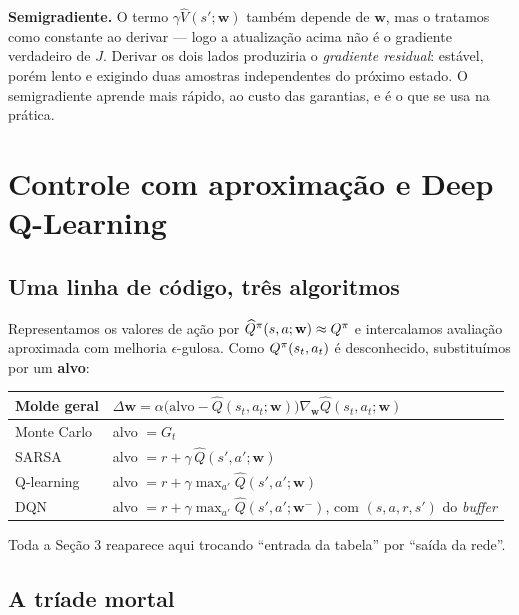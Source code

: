\documentclass[11pt]{article}
\newcommand{\Qhat}{\widehat{Q}}
\newcommand{\Vhat}{\widehat{V}}
\newcommand{\wv}{\mathbf{w}}
\newcommand{\wtar}{\mathbf{w}^{-}}
\begin{document}
\begin{ideiabox}
  \textbf{Semigradiente.} O termo $\gamma\Vhat(s';\wv)$ também depende de $\wv$,
  mas o tratamos como constante ao derivar --- logo a atualização acima não é o
  gradiente verdadeiro de $J$. Derivar os dois lados produziria o
  \emph{gradiente residual}: estável, porém lento e exigindo duas amostras
  independentes do próximo estado. O semigradiente aprende mais rápido, ao custo
  das garantias, e é o que se usa na prática.
\end{ideiabox}

\section{Controle com aproximação e Deep Q-Learning}

\subsection{Uma linha de código, três algoritmos}

Representamos os valores de ação por $\Qhat^{\pol}(s,a;\wv) \approx Q^{\pol}$ e
intercalamos avaliação aproximada com melhoria $\epsilon$-gulosa. Como
$Q^{\pi}(s_t,a_t)$ é desconhecido, substituímos por um \textbf{alvo}:

\begin{center}\small
\begin{tabular}{ll}
  \toprule
  \textbf{Molde geral} & $\Delta\wv = \alpha\bigl(\text{alvo} - \Qhat(s_t,a_t;\wv)\bigr)\nabla_{\wv}\Qhat(s_t,a_t;\wv)$ \\
  \midrule
  Monte Carlo & alvo $= G_t$ \\
  SARSA       & alvo $= r + \gamma\,\Qhat(s',a';\wv)$ \\
  Q-learning  & alvo $= r + \gamma \max_{a'} \Qhat(s',a';\wv)$ \\
  DQN         & alvo $= r + \gamma \max_{a'} \Qhat(s',a';\wtar)$, com $(s,a,r,s')$ do \emph{buffer} \\
  \bottomrule
\end{tabular}
\end{center}

Toda a Seção 3 reaparece aqui trocando ``entrada da tabela'' por ``saída da
rede''.

\subsection{A tríade mortal}
\end{document}
